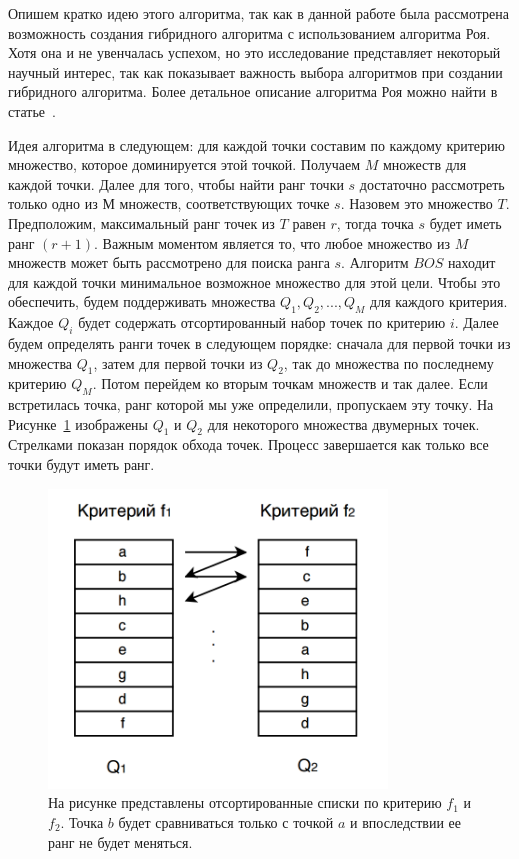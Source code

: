 Опишем кратко идею этого алгоритма, так как в данной работе была рассмотрена возможность создания гибридного алгоритма с использованием алгоритма Роя. Хотя она и не увенчалась успехом, но это исследование представляет некоторый научный интерес, так как показывает важность выбора алгоритмов при создании гибридного алгоритма. Более детальное описание алгоритма Роя можно найти в статье~\cite{Roy}.

Идея алгоритма в следующем: для каждой точки составим по каждому критерию множество, которое доминируется этой точкой. Получаем $M$ множеств для каждой точки. Далее для того, чтобы найти ранг точки $s$ достаточно рассмотреть только одно из $М$ множеств, соответствующих точке $s$. Назовем это множество $T$. Предположим, максимальный ранг точек из $T$ равен $r$, тогда точка $s$ будет иметь ранг $(r+1)$. Важным моментом является то, что любое множество из $M$ множеств может быть рассмотрено для поиска ранга $s$. Алгоритм $BOS$ находит для каждой точки минимальное возможное множество для этой цели. Чтобы это обеспечить, будем поддерживать множества $Q_1, Q_2, ..., Q_M$ для каждого критерия. Каждое $Q_i$ будет содержать отсортированный набор точек по критерию $i$. Далее будем определять ранги точек в следующем порядке: сначала для первой точки из множества $Q_1$, затем для первой точки из $Q_2$, так до множества по последнему критерию $Q_M$. Потом перейдем ко вторым точкам множеств и так далее. Если встретилась точка, ранг которой мы уже определили, пропускаем эту точку. На Рисунке~\ref{bos_descr} изображены $Q_1$ и $Q_2$ для некоторого множества двумерных точек. Стрелками показан порядок обхода точек. Процесс завершается как только все точки будут иметь ранг.

\begin{figure}
\begin{center}
\includegraphics[width=9cm]{pic/bos_pic}
\caption{На рисунке представлены отсортированные списки по критерию $f_1$ и $f_2$. Точка $b$ будет сравниваться только с точкой $a$ и впоследствии ее ранг не будет меняться.}
\label{bos_descr}
\end{center}
\end{figure}

